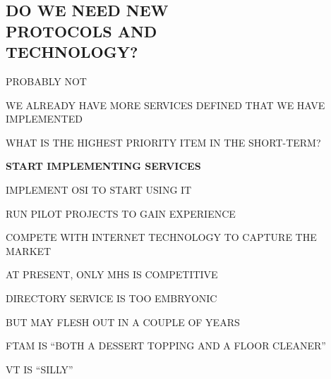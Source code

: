 

\def\emph#1{\underline{#1}}

\raggedright


\let\tradeNAMfont=\relax
\let\tradeORGfont=\relax



\begin{bwslide}
\part*	{DO WE NEED NEW\\ PROTOCOLS AND\\ TECHNOLOGY?}\bf

\begin{nrtc}
\item	PROBABLY NOT

\item	WE ALREADY HAVE MORE SERVICES DEFINED THAT WE HAVE IMPLEMENTED

\item	WHAT IS THE HIGHEST PRIORITY ITEM IN THE SHORT-TERM?
\end{nrtc}
\end{bwslide}


\begin{bwslide}
\begin{center}\Huge\bf
START IMPLEMENTING SERVICES
\end{center}
\end{bwslide}


\begin{bwslide}

\begin{nrtc}
\item	IMPLEMENT OSI TO START USING IT

\item	RUN PILOT PROJECTS TO GAIN EXPERIENCE

\item	COMPETE WITH INTERNET TECHNOLOGY TO CAPTURE THE MARKET
\end{nrtc}
\end{bwslide}


\begin{bwslide}

\begin{nrtc}
\item	AT PRESENT, ONLY MHS IS COMPETITIVE

\item	DIRECTORY SERVICE IS TOO EMBRYONIC
    \begin{nrtc}
    \item	BUT MAY FLESH OUT IN A COUPLE OF YEARS
    \end{nrtc}

\item	FTAM IS ``BOTH A DESSERT TOPPING AND A FLOOR CLEANER''

\item	VT IS ``SILLY''
\end{nrtc}
\end{bwslide}


